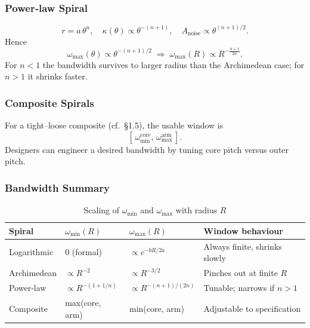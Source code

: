 \subsubsection{Power‐law Spiral}

\[
  r = a\,\theta^{n},\quad
  \kappa(\theta)\propto\theta^{-(n+1)},\quad
  A_{\text{noise}}\propto\theta^{(n+1)/2}.
\]
Hence
\[
  \omega_{\max}(\theta)\propto\theta^{-(n+1)/2}
  \;\Longrightarrow\;
  \omega_{\max}(R)\propto R^{-\tfrac{n+1}{2n}}.
\]
For \(n<1\) the bandwidth survives to larger radius than the Archimedean case; for \(n>1\) it shrinks faster.

\subsubsection{Composite Spirals}

For a tight–loose composite (cf.\ §1.5), the usable window is
\[
  [\,\omega_{\min}^{\mathrm{core}},\,\omega_{\max}^{\mathrm{arm}}\,].
\]
Designers can engineer a desired bandwidth by tuning core pitch versus outer pitch.

\subsubsection{Bandwidth Summary}

\begin{table}[H]
  \small
  \centering
  \caption{Scaling of \(\omega_{\min}\) and \(\omega_{\max}\) with radius \(R\)}
  \label{tab:bandwidth-summary}
  \begin{tabular}{@{}p{} p{} p{} p{}@{}}
    \toprule
    \textbf{Spiral}      & \(\omega_{\min}(R)\)     & \(\omega_{\max}(R)\)      & \textbf{Window behaviour}            \\
    \midrule
    Logarithmic         & \(0\) (formal)           & \(\propto e^{-bR/2a}\)    & Always finite, shrinks slowly       \\
    Archimedean         & \(\propto R^{-2}\)       & \(\propto R^{-3/2}\)      & Pinches out at finite \(R\)         \\
    Power‐law           & \(\propto R^{-(1+1/n)}\) & \(\propto R^{-(n+1)/(2n)}\)& Tunable; narrows if \(n>1\)         \\
    Composite           & max(core, arm)           & min(core, arm)            & Adjustable to specification         \\
    \bottomrule
  \end{tabular}
\end{table}

